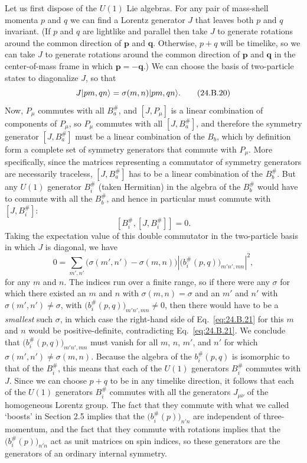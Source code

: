 Let us first dispose of the $U(1)$ Lie algebras. For any pair of mass-shell
momenta $p$ and $q$ we can find a Lorentz generator $J$ that leaves both $p$
and $q$ invariant. (If $p$ and $q$ are lightlike and parallel then take $J$ to
generate rotations around the common direction of $\mathbf{p}$ and
$\mathbf{q}$. Otherwise, $p+q$ will be timelike, so we can take $J$ to
generate rotations around the common direction of $\mathbf{p}$ and
$\mathbf{q}$ in the center-of-mass frame in which $\mathbf{p}=-\mathbf{q}$.)
We can choose the basis of two-particle states to diagonalize $J$, so that
\begin{equation}
 J\lvert p m,q n\rangle=\sigma(m,n)\lvert p m,q n\rangle.
\tag{24.B.20}\label{eq:24.B.20}
\end{equation}
Now, $P_\mu$ commutes with all $B_a^\#$, and $[J,P_\mu]$ is a linear
combination of components of $P_\mu$, so $P_\mu$ commutes with all
$[J,B_a^\#]$, and therefore the symmetry generator $[J,B_a^\#]$
must be a linear combination of the $B_b$, which by definition form a
complete set of symmetry generators that commute with $P_\mu$. More
specifically, since the matrices representing a commutator of symmetry
generators are necessarily traceless, $[J,B_a^\#]$ has to be a linear
combination of the $B_b^\#$. But any $U(1)$ generator $B_i^\#$ (taken
Hermitian) in the algebra of the $B_b^\#$ would have to commute with all
the $B_b^\#$, and hence in particular must commute with $[J,B_i^\#]$:
\[
 [B_i^\#,[J,B_i^\#]]=0.
\]
Taking the expectation value of this double commutator in the two-particle
basis in which $J$ is diagonal, we have
\begin{equation}
 0=\sum_{m',n'}
 \bigl(\sigma(m',n')-\sigma(m,n)\bigr)
 \left|\bigl(b_i^\#(p,q)\bigr)_{m'n',mn}\right|^2,
\tag{24.B.21}\label{eq:24.B.21}
\end{equation}
for any $m$ and $n$. The indices run over a finite range, so if there were any
$\sigma$ for which there existed an $m$ and $n$ with $\sigma(m,n)=\sigma$ and
an $m'$ and $n'$ with $\sigma(m',n')\ne\sigma$, with
$\bigl(b_i^\#(p,q)\bigr)_{m'n',mn}\ne0$, then there would have to be a
\emph{smallest} such $\sigma$, in which case the right-hand side of
Eq.~\eqref{eq:24.B.21} for this $m$ and $n$ would be positive-definite,
contradicting Eq.~\eqref{eq:24.B.21}. We conclude that
$\bigl(b_i^\#(p,q)\bigr)_{m'n',mn}$ must vanish for all $m$, $n$, $m'$, and
$n'$ for which $\sigma(m',n')\ne\sigma(m,n)$. Because the algebra of the
$b_i^\#(p,q)$ is isomorphic to that of the $B_i^\#$, this means that each of
the $U(1)$ generators $B_i^\#$ commutes with $J$. Since we can choose $p+q$ to
be in any timelike direction, it follows that each of the $U(1)$ generators
$B_i^\#$ commutes with all the generators $J_{\mu\nu}$ of the homogeneous
Lorentz group. The fact that they commute with what we called `boosts' in
Section 2.5 implies that the $\bigl(b_i^\#(p)\bigr)_{n'n}$ are independent of
three-momentum, and the fact that they commute with rotations implies that the
$\bigl(b_i^\#(p)\bigr)_{n'n}$ act as unit matrices on spin indices, so these
generators are the generators of an ordinary internal symmetry.

